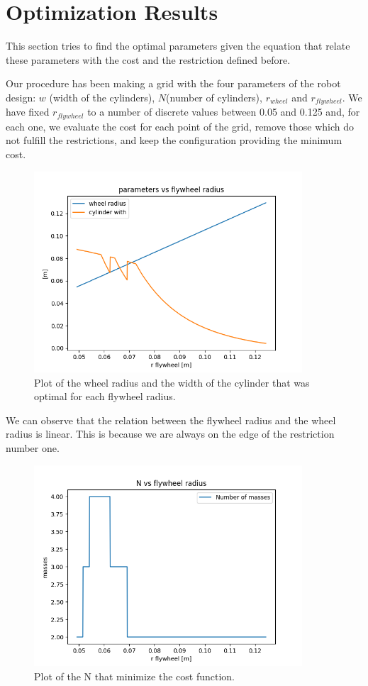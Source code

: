 \section{Optimization Results} \label{sec: parameters results}
This section tries to find the optimal parameters given the equation that relate these parameters with the cost
and the restriction defined before.

Our procedure has been making a grid with the four parameters of the robot 
design: $w$ (width of the cylinders), $N$(number of cylinders), $r_{wheel}$ and $r_{flywheel}$.
We have fixed $r_{flywheel}$ to a number of discrete values between 0.05 and 0.125 and, for each one, we evaluate the cost for each point of the grid,
remove those which do not fulfill the restrictions, and keep the configuration providing the minimum cost. 

\begin{figure}[H]
	\centering
	\includegraphics[width=10cm]{img/optimization/parameters.png}
	\caption{Plot of the wheel radius and the width of the cylinder that was optimal for each flywheel radius.}
	\label{fig:Parameters plot}
\end{figure}

We can observe that the relation between the flywheel radius and 
the wheel radius is linear. This is because we are always on the
edge of the restriction number one.

\begin{figure}[H]
	\centering
	\includegraphics[width=10cm]{img/optimization/N.png}
	\caption{Plot of the N that minimize the cost function.}
	\label{fig:Parameters plot}
\end{figure}


